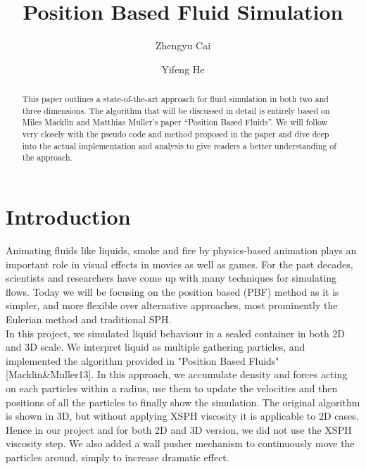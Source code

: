 \documentclass[sigconf]{acmart}
\begin{document}
\title{Position Based Fluid Simulation}

\author{Zhengyu Cai}

\author{Yifeng He}

\begin{abstract}
 This paper outlines a state-of-the-art approach for fluid simulation in both two and three dimensions. The algorithm that will be discussed in detail is entirely based on Miles Macklin and Matthias Muller’s paper “Position Based Fluids”. We will follow very closely with the pseudo code and method proposed in the paper and dive deep into the actual implementation and analysis to give readers a better understanding of the approach.
\end{abstract}

\maketitle

\section{Introduction}
Animating fluids like liquids, smoke and fire by physics-based animation plays an important role in visual effects in movies as well as games. For the past decades, scientists and researchers have come up with many techniques for simulating flows. Today we will be focusing on the position based (PBF) method as it is simpler, and more flexible over alternative approaches, most prominently the Eulerian method and traditional SPH. \\
In this project, we simulated liquid behaviour in a sealed container in both 2D and 3D scale. We interpret liquid as multiple gathering particles, and implemented the algorithm provided in "Position Based Fluids" [Macklin\&Muller13]. In this approach, we accumulate density and forces acting on each particles within a radius, use them to update the velocities and then positions of all the particles to finally show the simulation. The original algorithm is shown in 3D, but without applying XSPH viscosity it is applicable to 2D cases. Hence in our project and for both 2D and 3D version, we did not use the XSPH viscosity step. We also added a wall pusher mechanism to continuously move the particles around, simply to increase dramatic effect.
\end{document}
